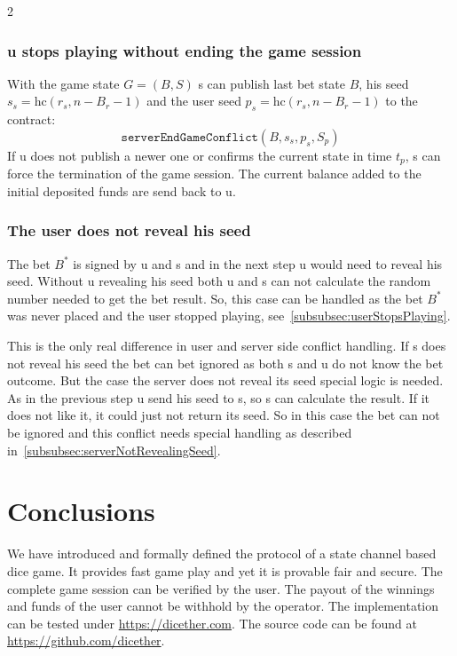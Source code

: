 \documentclass[oneside]{amsart}
\begin{document}
\begin{multicols}{2}
\subsubsection{\Gls{u} stops playing without ending the game session}
With the game state $G = (B,S)$ \gls{s} can publish last bet state $B$, his seed $s_s=\text{hc}(r_s, n - B_r - 1)$
and the user seed $p_s=\text{hc}(r_s, n - B_r - 1)$ to the contract:
\begin{equation}
    \texttt{serverEndGameConflict}(B, s_s, p_s, S_p)
\end{equation}
If \gls{u} does not publish a newer one or confirms the current state in time $t_p$, \gls{s} can force the termination
of the game session.
The current balance added to the initial deposited funds are send back to \gls{u}.

\subsubsection{The user does not reveal his seed}
The bet $B^*$ is signed by \gls{u} and \gls{s} and in the next step \gls{u} would need to reveal his seed.
Without \gls{u} revealing his seed both \gls{u} and \gls{s} can not calculate the random number needed to get the bet result.
So, this case can be handled as the bet $B^*$ was never placed and the user stopped playing, see~\autoref{subsubsec:userStopsPlaying}.

This is the only real difference in user and server side conflict handling.
If \gls{s} does not reveal his seed the bet can bet ignored as both \gls{s} and \gls{u} do not know the bet outcome.
But the case the server does not reveal its seed special logic is needed.
As in the previous step \gls{u} send his seed to \gls{s}, so \gls{s} can calculate the result.
If it does not like it, it could just not return its seed.
So in this case the bet can not be ignored and this conflict needs special handling as described in~\autoref{subsubsec:serverNotRevealingSeed}.

\section{Conclusions}\label{sec:sumary}
We have introduced and formally defined the protocol of a state channel based dice game.
It provides fast game play and yet it is provable fair and secure.
The complete game session can be verified by the user.
The payout of the winnings and funds of the user cannot be withhold by the operator.
The implementation can be tested under \url{https://dicether.com}.
The source code can be found at \url{https://github.com/dicether}.

\printbibliography
\end{multicols}
\end{document}
